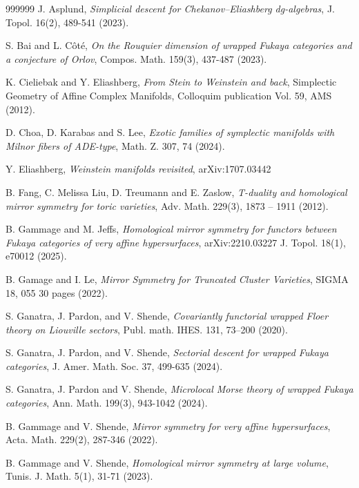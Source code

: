 \documentclass[a4paper,12pt, twoside, pdftex]{amsart}
\theoremstyle{definition}
\numberwithin{equation}{section}
\begin{document}
\begin{thebibliography}{999999}
J. Asplund,
\emph{Simplicial descent for Chekanov--Eliashberg dg-algebras},
J. Topol. 16(2), 489-541 (2023).

S. Bai and L. Côté,
\emph{On the Rouquier dimension of wrapped Fukaya categories and a conjecture of Orlov},
Compos. Math. 159(3), 437-487 (2023).

K. Cieliebak and Y. Eliashberg,
\emph{From Stein to Weinstein and back},
Simplectic Geometry of Affine Complex Manifolds,
Colloquim publication Vol. 59, AMS (2012).

D. Choa, D. Karabas and S. Lee,
\emph{Exotic families of symplectic manifolds with Milnor fibers of ADE-type},
Math. Z. 307, 74 (2024).

Y. Eliashberg,
\emph{Weinstein manifolds revisited},
arXiv:1707.03442

B. Fang, C. Melissa Liu, D. Treumann and E. Zaslow, 
\emph{T-duality and homological
mirror symmetry for toric varieties},
Adv. Math. 229(3), 1873 – 1911 (2012).

B. Gammage and M. Jeffs,
\emph{Homological mirror symmetry for functors between Fukaya categories of very affine hypersurfaces},
arXiv:2210.03227 
J. Topol. 18(1), e70012 (2025).

B. Gamage and I. Le,
\emph{Mirror Symmetry for Truncated Cluster Varieties},
SIGMA 18, 055 30 pages (2022).

S. Ganatra, J. Pardon, and V. Shende,
\emph{Covariantly functorial wrapped Floer theory on Liouville sectors},
Publ. math. IHES. 131, 73–200 (2020).

S. Ganatra, J. Pardon, and V. Shende,
\emph{Sectorial descent for wrapped Fukaya categories},
J. Amer. Math. Soc. 37, 499-635 (2024).

S. Ganatra,  J. Pardon and V. Shende,
\emph{Microlocal Morse theory of wrapped Fukaya categories},
Ann. Math. 199(3), 943-1042 (2024).

B. Gammage and V. Shende,
\emph{Mirror symmetry for very affine hypersurfaces},
Acta. Math. 229(2), 287-346 (2022).

B. Gammage and V. Shende,
\emph{Homological mirror symmetry at large volume},
Tunis. J. Math. 5(1), 31-71 (2023).


\end{thebibliography}
\end{document}
